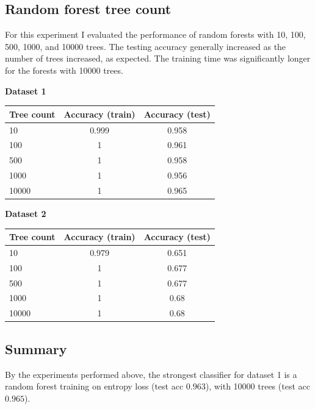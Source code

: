 \documentclass{article}
\begin{document}
\subsection{Random forest tree count}

For this experiment I evaluated the performance of random forests with 10, 100, 500, 1000, and 10000 trees. The testing accuracy generally increased as the number of trees increased, as expected. The training time was significantly longer for the forests with 10000 trees.

\begin{center}\textbf{Dataset 1}\end{center}
\begin{center}
\begin{tabular}{| l | c | c |}
    \hline
    \textbf{Tree count} & \textbf{Accuracy (train)} & \textbf{Accuracy (test)} \\
    \hline
        10 & 0.999 & 0.958 \\
        100 & 1 & 0.961\\
        500 & 1 & 0.958\\
        1000 & 1 & 0.956 \\
        10000 & 1 & 0.965 \\
    \hline
\end{tabular}
\end{center}

\begin{center}\textbf{Dataset 2}\end{center}
\begin{center}
\begin{tabular}{| l | c | c |}
    \hline
    \textbf{Tree count} & \textbf{Accuracy (train)} & \textbf{Accuracy (test)} \\
    \hline
        10 & 0.979 & 0.651 \\
        100 & 1 & 0.677\\
        500 & 1 & 0.677\\
        1000 & 1 & 0.68 \\
        10000 & 1 & 0.68 \\
    \hline
\end{tabular}
\end{center}

\subsection{Summary}

By the experiments performed above, the strongest classifier for dataset 1 is a random forest training on entropy loss (test acc $0.963$), with 10000 trees (test acc $0.965$).
\end{document}
